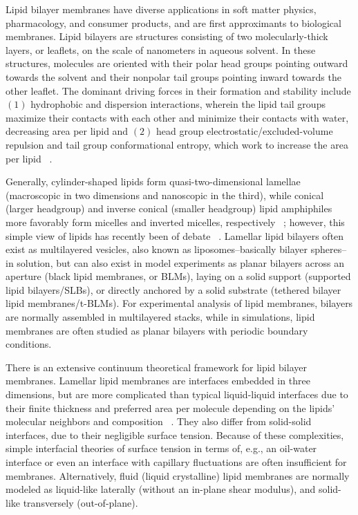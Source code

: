 \documentclass[9pt,bestpractices,pubversion]{livecoms}
\begin{document}
Lipid bilayer membranes have diverse applications in soft matter physics, pharmacology, and consumer products, and are first approximants to biological membranes.
Lipid bilayers are structures consisting of two molecularly-thick layers, or leaflets, on the scale of nanometers in aqueous solvent.
In these structures, molecules are oriented with their polar head groups pointing outward towards the solvent and their nonpolar tail groups pointing inward towards the other leaflet.
The dominant driving forces in their formation and stability include $(1)$ hydrophobic and dispersion interactions, wherein the lipid tail groups maximize their contacts with each other and minimize their contacts with water, decreasing area per lipid and $(2)$ head group electrostatic/excluded-volume repulsion and tail group conformational entropy, which work to increase the area per lipid ~\cite{Ben-Shaul1995}.

Generally, cylinder-shaped lipids form quasi-two-dimensional lamellae (macroscopic in two dimensions and nanoscopic in the third), while conical (larger headgroup) and inverse conical (smaller headgroup) lipid amphiphiles more favorably form micelles and inverted micelles, respectively ~\cite{Israelachvili2011}; however, this simple view of lipids has recently been of debate ~\cite{Sodt2016}.
Lamellar lipid bilayers often exist as multilayered vesicles, also known as liposomes--basically bilayer spheres--in solution, but can also exist in model experiments as planar bilayers across an aperture (black lipid membranes, or BLMs), laying on a solid support (supported lipid bilayers/SLBs), or directly anchored by a solid substrate (tethered bilayer lipid membranes/t-BLMs).
For experimental analysis of lipid membranes, bilayers are normally assembled in multilayered stacks, while in simulations, lipid membranes are often studied as planar bilayers with periodic boundary conditions.

There is an extensive continuum theoretical framework for lipid bilayer membranes.
Lamellar lipid membranes are interfaces embedded in three dimensions, but are more complicated than typical liquid-liquid interfaces due to their finite thickness and preferred area per molecule depending on the lipids' molecular neighbors and composition ~\cite{Diamant2011,Safran1994}.
They also differ from solid-solid interfaces, due to their negligible surface tension.
Because of these complexities, simple interfacial theories of surface tension in terms of, e.g., an oil-water interface or even an interface with capillary fluctuations are often insufficient for membranes.
Alternatively, fluid (liquid crystalline) lipid membranes are normally modeled as liquid-like laterally (without an in-plane shear modulus), and solid-like transversely (out-of-plane).
\end{document}
